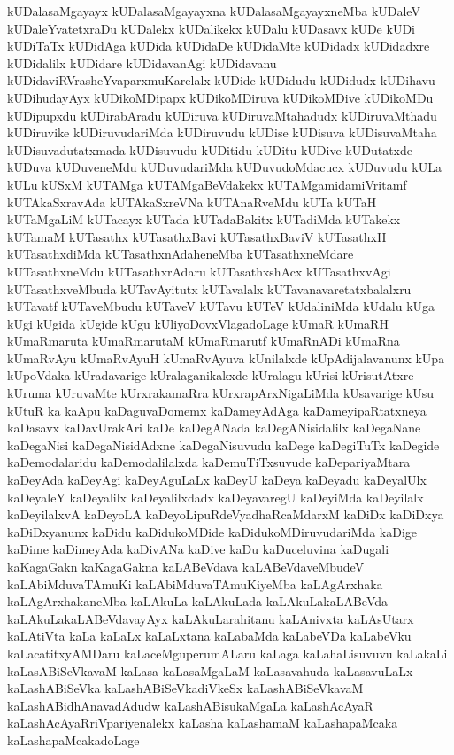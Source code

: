 {kUDalasaMgayayx
kUDalasaMgayayxna
kUDalasaMgayayxneMba
kUDaleV
kUDaleYvatetxraDu
kUDalekx
kUDalikekx
kUDalu
kUDasavx
kUDe
kUDi
kUDiTaTx
kUDidAga
kUDida
kUDidaDe
kUDidaMte
kUDidadx
kUDidadxre
kUDidalilx
kUDidare
kUDidavanAgi
kUDidavanu
kUDidaviRVrasheYvaparxmuKarelalx
kUDide
kUDidudu
kUDidudx
kUDihavu
kUDihudayAyx
kUDikoMDipapx
kUDikoMDiruva
kUDikoMDive
kUDikoMDu
kUDipupxdu
kUDirabAradu
kUDiruva
kUDiruvaMtahadudx
kUDiruvaMthadu
kUDiruvike
kUDiruvudariMda
kUDiruvudu
kUDise
kUDisuva
kUDisuvaMtaha
kUDisuvadutatxmada
kUDisuvudu
kUDitidu
kUDitu
kUDive
kUDutatxde
kUDuva
kUDuveneMdu
kUDuvudariMda
kUDuvudoMdacucx
kUDuvudu
kULa
kULu
kUSxM
kUTAMga
kUTAMgaBeVdakekx
kUTAMgamidamiVritamf
kUTAkaSxravAda
kUTAkaSxreVNa
kUTAnaRveMdu
kUTa
kUTaH
kUTaMgaLiM
kUTacayx
kUTada
kUTadaBakitx
kUTadiMda
kUTakekx
kUTamaM
kUTasathx
kUTasathxBavi
kUTasathxBaviV
kUTasathxH
kUTasathxdiMda
kUTasathxnAdaheneMba
kUTasathxneMdare
kUTasathxneMdu
kUTasathxrAdaru
kUTasathxshAcx
kUTasathxvAgi
kUTasathxveMbuda
kUTavAyitutx
kUTavalalx
kUTavanavaretatxbalalxru
kUTavatf
kUTaveMbudu
kUTaveV
kUTavu
kUTeV
kUdaliniMda
kUdalu
kUga
kUgi
kUgida
kUgide
kUgu
kUliyoDovxVlagadoLage
kUmaR
kUmaRH
kUmaRmaruta
kUmaRmarutaM
kUmaRmarutf
kUmaRnADi
kUmaRna
kUmaRvAyu
kUmaRvAyuH
kUmaRvAyuva
kUnilalxde
kUpAdijalavanunx
kUpa
kUpoVdaka
kUradavarige
kUralaganikakxde
kUralagu
kUrisi
kUrisutAtxre
kUruma
kUruvaMte
kUrxrakamaRra
kUrxrapArxNigaLiMda
kUsavarige
kUsu
kUtuR
ka
kaApu
kaDaguvaDomemx
kaDameyAdAga
kaDameyipaRtatxneya
kaDasavx
kaDavUrakAri
kaDe
kaDegANada
kaDegANisidalilx
kaDegaNane
kaDegaNisi
kaDegaNisidAdxne
kaDegaNisuvudu
kaDege
kaDegiTuTx
kaDegide
kaDemodalaridu
kaDemodalilalxda
kaDemuTiTxsuvude
kaDepariyaMtara
kaDeyAda
kaDeyAgi
kaDeyAguLaLx
kaDeyU
kaDeya
kaDeyadu
kaDeyalUlx
kaDeyaleY
kaDeyalilx
kaDeyalilxdadx
kaDeyavaregU
kaDeyiMda
kaDeyilalx
kaDeyilalxvA
kaDeyoLA
kaDeyoLipuRdeVyadhaRcaMdarxM
kaDiDx
kaDiDxya
kaDiDxyanunx
kaDidu
kaDidukoMDide
kaDidukoMDiruvudariMda
kaDige
kaDime
kaDimeyAda
kaDivANa
kaDive
kaDu
kaDuceluvina
kaDugali
kaKagaGakn
kaKagaGakna
kaLABeVdava
kaLABeVdaveMbudeV
kaLAbiMduvaTAmuKi
kaLAbiMduvaTAmuKiyeMba
kaLAgArxhaka
kaLAgArxhakaneMba
kaLAkuLa
kaLAkuLada
kaLAkuLakaLABeVda
kaLAkuLakaLABeVdavayAyx
kaLAkuLarahitanu
kaLAnivxta
kaLAsUtarx
kaLAtiVta
kaLa
kaLaLx
kaLaLxtana
kaLabaMda
kaLabeVDa
kaLabeVku
kaLacatitxyAMDaru
kaLaceMguperumALaru
kaLaga
kaLahaLisuvuvu
kaLakaLi
kaLasABiSeVkavaM
kaLasa
kaLasaMgaLaM
kaLasavahuda
kaLasavuLaLx
kaLashABiSeVka
kaLashABiSeVkadiVkeSx
kaLashABiSeVkavaM
kaLashABidhAnavadAdudw
kaLashABisukaMgaLa
kaLashAcAyaR
kaLashAcAyaRriVpariyenalekx
kaLasha
kaLashamaM
kaLashapaMcaka
kaLashapaMcakadoLage
}
